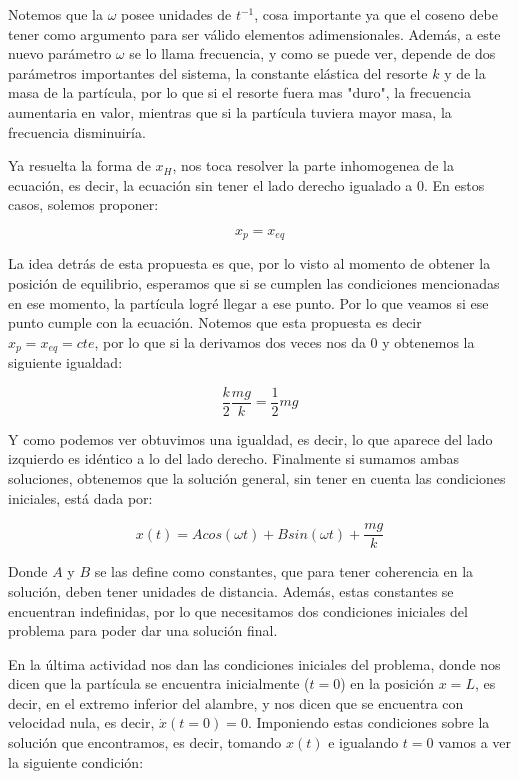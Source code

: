 \documentclass{article}
\begin{document}
\begin{multicols}{2}
Notemos que la $\omega$ posee unidades de $t^{-1}$, cosa importante ya que el coseno debe tener como argumento para ser válido elementos adimensionales. Además, a este nuevo parámetro $\omega$ se lo llama frecuencia, y como se puede ver, depende de dos parámetros importantes del sistema, la constante elástica del resorte $k$ y de la masa de la partícula, por lo que si el resorte fuera mas "duro", la frecuencia aumentaria en valor, mientras que si la partícula tuviera mayor masa, la frecuencia disminuiría.

Ya resuelta la forma de $x_H$, nos toca resolver la parte inhomogenea de la ecuación, es decir, la ecuación sin tener el lado derecho igualado a $0$. En estos casos, solemos proponer:

\begin{equation}
    x_p = x_{eq}
\end{equation}

La idea detrás de esta propuesta es que, por lo visto al momento de obtener la posición de equilibrio, esperamos que si se cumplen las condiciones mencionadas en ese momento, la partícula logré llegar a ese punto. Por lo que veamos si ese punto cumple con la ecuación. Notemos que esta propuesta es decir $x_p = x_{eq} = cte$, por lo que si la derivamos dos veces nos da $0$ y obtenemos la siguiente igualdad:

\begin{equation}
    \frac{k}{2} \frac{mg}{k} = \frac{1}{2}mg
\end{equation}

Y como podemos ver obtuvimos una igualdad, es decir, lo que aparece del lado izquierdo es idéntico a lo del lado derecho. Finalmente si sumamos ambas soluciones, obtenemos que la solución general, sin tener en cuenta las condiciones iniciales, está dada por:

\begin{equation}
    x(t) = Acos(\omega t) + Bsin(\omega t) + \frac{mg}{k}
\end{equation}

Donde $A$ y $B$ se las define como constantes, que para tener coherencia en la solución, deben tener unidades de distancia. Además, estas constantes se encuentran indefinidas, por lo que necesitamos dos condiciones iniciales del problema para poder dar una solución final.

En la última actividad nos dan las condiciones iniciales del problema, donde nos dicen que la partícula se encuentra inicialmente ($t = 0$) en la posición $x = L$, es decir, en el extremo inferior del alambre, y nos dicen que se encuentra con velocidad nula, es decir, $\dot{x}(t = 0) = 0$. Imponiendo estas condiciones sobre la solución que encontramos, es decir, tomando $x(t)$ e igualando $t = 0$ vamos a ver la siguiente condición:


\end{multicols}
\end{document}
